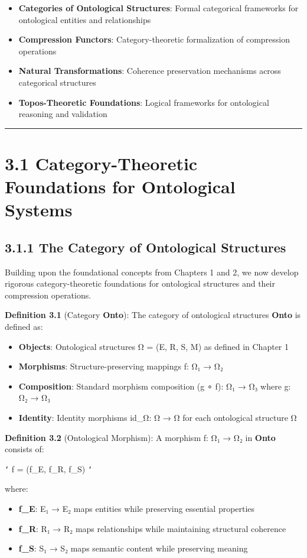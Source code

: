\begin{itemize}
\item \textbf{Categories of Ontological Structures}: Formal categorical frameworks for ontological entities and relationships
\item \textbf{Compression Functors}: Category-theoretic formalization of compression operations
\item \textbf{Natural Transformations}: Coherence preservation mechanisms across categorical structures
\item \textbf{Topos-Theoretic Foundations}: Logical frameworks for ontological reasoning and validation
\end{itemize}

\hrule

\section{3.1 Category-Theoretic Foundations for Ontological Systems}

\subsection{3.1.1 The Category of Ontological Structures}

Building upon the foundational concepts from Chapters 1 and 2, we now develop rigorous category-theoretic foundations for ontological structures and their compression operations.

\textbf{Definition 3.1} (Category \textbf{Onto}): The category of ontological structures \textbf{Onto} is defined as:

\begin{itemize}
\item \textbf{Objects}: Ontological structures Ω = (E, R, S, M) as defined in Chapter 1
\item \textbf{Morphisms}: Structure-preserving mappings f: Ω₁ → Ω₂
\item \textbf{Composition}: Standard morphism composition (g ∘ f): Ω₁ → Ω₃ where g: Ω₂ → Ω₃
\item \textbf{Identity}: Identity morphisms id_Ω: Ω → Ω for each ontological structure Ω
\end{itemize}

\textbf{Definition 3.2} (Ontological Morphism): A morphism f: Ω₁ → Ω₂ in \textbf{Onto} consists of:

\texttt{`}
f = (f_E, f_R, f_S)
\texttt{`}

where:
\begin{itemize}
\item \textbf{f_E}: E₁ → E₂ maps entities while preserving essential properties
\item \textbf{f_R}: R₁ → R₂ maps relationships while maintaining structural coherence
\item \textbf{f_S}: S₁ → S₂ maps semantic content while preserving meaning
\end{itemize}

